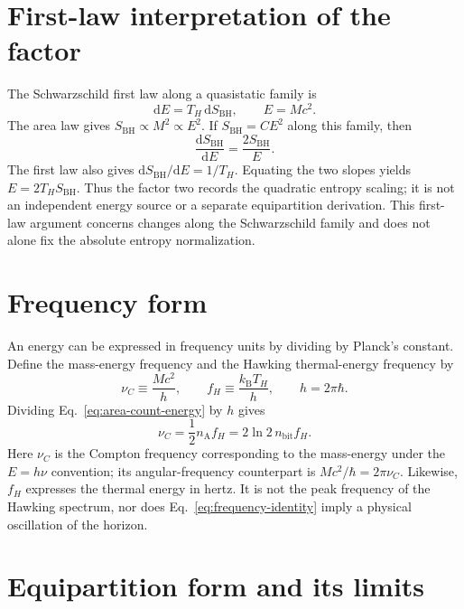 \documentclass[12pt]{article}
\begin{document}
\section{First-law interpretation of the factor}

The Schwarzschild first law along a quasistatic family is
\begin{equation}
  \mathrm{d}E=T_H\,\mathrm{d}S_{\mathrm{BH}},
  \qquad E=Mc^2.
  \label{eq:first-law}
\end{equation}
The area law gives $S_{\mathrm{BH}}\propto M^2\propto E^2$. If $S_{\mathrm{BH}}=C E^2$ along this family, then
\begin{equation}
  \frac{\mathrm{d}S_{\mathrm{BH}}}{\mathrm{d}E}
  =\frac{2S_{\mathrm{BH}}}{E}.
  \label{eq:entropy-slope}
\end{equation}
The first law also gives $\mathrm{d}S_{\mathrm{BH}}/\mathrm{d}E=1/T_H$. Equating the two slopes yields $E=2T_HS_{\mathrm{BH}}$. Thus the factor two records the quadratic entropy scaling; it is not an independent energy source or a separate equipartition derivation. This first-law argument concerns changes along the Schwarzschild family and does not alone fix the absolute entropy normalization.

\section{Frequency form}

An energy can be expressed in frequency units by dividing by Planck's constant. Define the mass-energy frequency and the Hawking thermal-energy frequency by
\begin{equation}
  \nu_C\equiv\frac{Mc^2}{h},
  \qquad
  f_H\equiv\frac{k_{\mathrm B}T_H}{h},
  \qquad h=2\pi\hbar.
  \label{eq:frequencies}
\end{equation}
Dividing Eq.~\eqref{eq:area-count-energy} by $h$ gives
\begin{equation}
  \nu_C=\frac{1}{2}n_{\mathrm A}f_H
  =2\ln2\,n_{\mathrm{bit}}f_H.
  \label{eq:frequency-identity}
\end{equation}
Here $\nu_C$ is the Compton frequency corresponding to the mass-energy under the $E=h\nu$ convention; its angular-frequency counterpart is $Mc^2/\hbar=2\pi\nu_C$. Likewise, $f_H$ expresses the thermal energy in hertz. It is not the peak frequency of the Hawking spectrum, nor does Eq.~\eqref{eq:frequency-identity} imply a physical oscillation of the horizon.

\section{Equipartition form and its limits}
\end{document}
